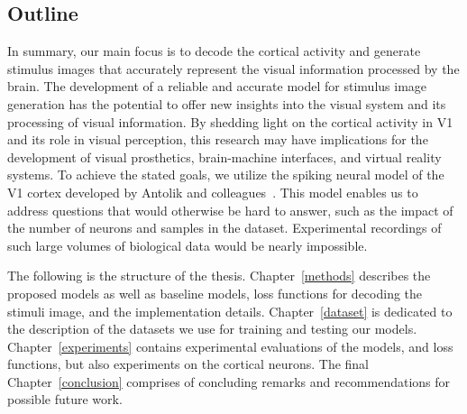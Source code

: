 \subsection*{Outline}

In summary, our main focus is to decode the cortical activity and generate stimulus images that accurately represent the visual information processed by the brain. The development of a reliable and accurate model for stimulus image generation has the potential to offer new insights into the visual system and its processing of visual information. By shedding light on the cortical activity in V1 and its role in visual perception, this research may have implications for the development of visual prosthetics, brain-machine interfaces, and virtual reality systems. 
To achieve the stated goals, we utilize the spiking neural model of the V1 cortex developed by Antolik and colleagues~\cite{antolik2018comprehensive}. This model enables us to address questions that would otherwise be hard to answer, such as the impact of the number of neurons and samples in the dataset. Experimental recordings of such large volumes of biological data would be nearly impossible.


The following is the structure of the thesis. Chapter~\ref{methods} describes the proposed models as well as baseline models, loss functions for decoding the stimuli image, and the implementation details. Chapter~\ref{dataset} is dedicated to the description of the datasets we use for training and testing our models. Chapter~\ref{experiments} contains experimental evaluations of the models, and loss functions, but also experiments on the cortical neurons. The final Chapter~\ref{conclusion} comprises of concluding remarks and recommendations for possible future work.